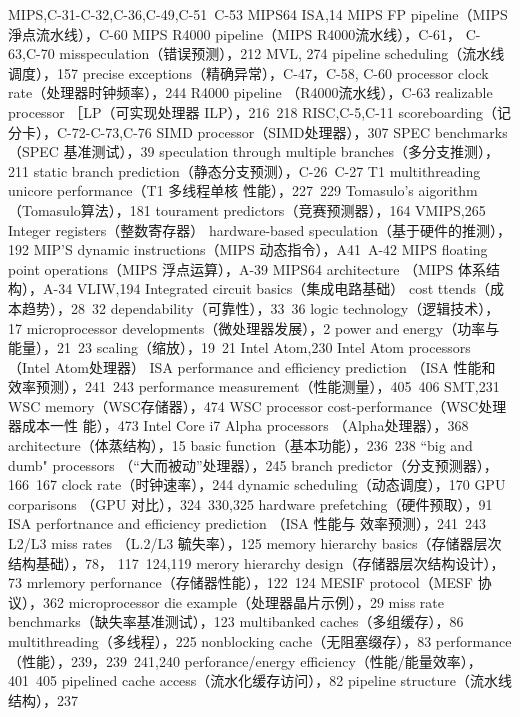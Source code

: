 MIPS,C-31-C-32,C-36,C-49,C-51~C-53
MIPS64 ISA,14
MIPS FP pipeline（MIPS 淨点流水线），C-60
MIPS R4000 pipeline（MIPS R4000流水线），C-61，
C-63,C-70
misspeculation（错误预测），212
MVL, 274
pipeline scheduling（流水线调度），157
precise exceptions（精确异常），C-47，C-58, C-60
processor clock rate（处理器时钟频率），244
R4000 pipeline （R4000流水线），C-63
realizable processor ［LP（可实现处理器 ILP），216~218
RISC,C-5,C-11
scoreboarding（记分卡），C-72-C-73,C-76
SIMD processor（SIMD处理器），307
SPEC benchmarks（SPEC 基准测试），39
speculation through multiple branches（多分支推测），
211
static branch prediction（静态分支预测），C-26~C-27
T1 multithreading unicore performance（T1 多线程单核
性能），227~229
Tomasulo's aigorithm（Tomasulo算法），181
tourament predictors（竞赛预测器），164
VMIPS,265
Integer registers（整数寄存器）
hardware-based speculation（基于硬件的推测），192
MIP'S dynamic instructions（MIPS 动态指令），A41~A-42
MIPS floating point operations（MIPS 浮点运算），A-39
MIPS64 architecture （MIPS 体系结构），A-34
VLIW,194
Integrated circuit basics（集成电路基础）
cost ttends（成本趋势），28~32
dependability（可靠性），33~36
logic technology（逻辑技术），17
microprocessor developments（微处理器发展），2
power and energy（功率与能量），21~23
scaling（缩放），19~21
Intel Atom,230
Intel Atom processors （Intel Atom处理器）
ISA performance and efficiency prediction （ISA 性能和
效率预测），241~243
performance measurement（性能测量），405~406
SMT,231
WSC memory（WSC存储器），474
WSC processor cost-performance（WSC处理器成本一性
能），473
Intel Core i7
Alpha processors （Alpha处理器），368
architecture（体蒸结构），15
basic function（基本功能），236~238
“big and dumb" processors （“大而被动”处理器），245
branch predictor（分支预测器），166~167
clock rate（时钟速率），244
dynamic scheduling（动态调度），170
GPU corparisons （GPU 对比），324~330,325
hardware prefetching（硬件预取），91
ISA perfortnance and efficiency prediction （ISA 性能与
效率预测），241~243
L2/L3 miss rates （L.2/L3 毓失率），125
memory hierarchy basics（存储器层次结构基础），78，
117~124,119
merory hierarchy design（存储器层次结构设计），73
mrlemory perfornance（存储器性能），122~124
MESIF protocol（MESF 协议），362
microprocessor die example（处理器晶片示例），29
miss rate benchmarks（缺失率基准测试），123
multibanked caches（多组缓存），86
multithreading（多线程），225
nonblocking cache（无阻塞缀存），83
performance（性能），239，239~241,240
perforance/energy efficiency（性能/能量效率），
401~405
pipelined cache access（流水化缓存访问），82
pipeline structure（流水线结构），237
